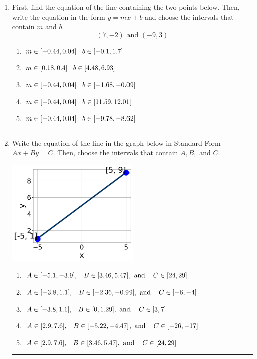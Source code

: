 \documentclass[14pt]{extbook}
\newcommand{\litem}[1]{\item#1\hspace*{-1cm}\rule{\textwidth}{0.4pt}}
\begin{document}
\begin{enumerate}
{\begin{enumerate}[label=\Alph*.]
\end{enumerate} }
\litem{
First, find the equation of the line containing the two points below. Then, write the equation in the form $ y=mx+b $ and choose the intervals that contain $m$ and $b$.\[ (7, -2) \text{ and } (-9, 3) \]\begin{enumerate}[label=\Alph*.]
\item \( m \in [-0.44, 0.04] \hspace*{3mm} b \in [-0.1, 1.7] \)
\item \( m \in [0.18, 0.4] \hspace*{3mm} b \in [4.48, 6.93] \)
\item \( m \in [-0.44, 0.04] \hspace*{3mm} b \in [-1.68, -0.09] \)
\item \( m \in [-0.44, 0.04] \hspace*{3mm} b \in [11.59, 12.01] \)
\item \( m \in [-0.44, 0.04] \hspace*{3mm} b \in [-9.78, -8.62] \)

\end{enumerate} }
\litem{
Write the equation of the line in the graph below in Standard Form $Ax+By=C$. Then, choose the intervals that contain $A, B, \text{ and } C$.
\begin{center}
    \includegraphics[width=0.5\textwidth]{../Figures/linearGraphToStandardCopyC.png}
\end{center}
\begin{enumerate}[label=\Alph*.]
\item \( A \in [-5.1, -3.9], \hspace{3mm} B \in [3.46, 5.47], \text{ and } \hspace{3mm} C \in [24, 29] \)
\item \( A \in [-3.8, 1.1], \hspace{3mm} B \in [-2.36, -0.99], \text{ and } \hspace{3mm} C \in [-6, -4] \)
\item \( A \in [-3.8, 1.1], \hspace{3mm} B \in [0, 1.29], \text{ and } \hspace{3mm} C \in [3, 7] \)
\item \( A \in [2.9, 7.6], \hspace{3mm} B \in [-5.22, -4.47], \text{ and } \hspace{3mm} C \in [-26, -17] \)
\item \( A \in [2.9, 7.6], \hspace{3mm} B \in [3.46, 5.47], \text{ and } \hspace{3mm} C \in [24, 29] \)


\end{enumerate}}
\end{enumerate}
\end{document}
